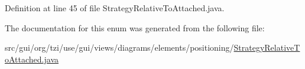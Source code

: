 Definition at line 45 of file Strategy\-Relative\-To\-Attached.\-java.



The documentation for this enum was generated from the following file\-:\begin{DoxyCompactItemize}
\item 
src/gui/org/tzi/use/gui/views/diagrams/elements/positioning/\hyperlink{_strategy_relative_to_attached_8java}{Strategy\-Relative\-To\-Attached.\-java}\end{DoxyCompactItemize}
